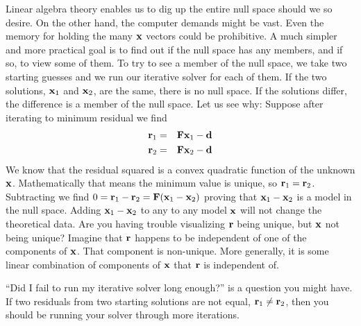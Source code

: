 \par
Linear algebra theory enables us to dig up the entire null space
should we so desire.
On the other hand, the computer demands might be vast.
Even the memory for holding the many $\bold x$ vectors could be prohibitive.
A much simpler and more practical goal
is to find out if the null space has any members,
and if so, to view some of them.
To try to see a member of the null space,
we take two starting guesses
and we run our iterative solver for each of them.
If the two solutions,
$\bold x_1$ and $\bold x_2$,
are the same, there is no null space.
If the solutions differ, the difference
is a member of the null space.
Let us see why:
Suppose after iterating to minimum residual we find
\begin{eqnarray}
\bold r_1 &=& \bold F\bold x_1 - \bold d
\\
\bold r_2 &=& \bold F\bold x_2 - \bold d 
\end{eqnarray}
We know that the residual squared is a convex quadratic function
of the unknown $\bold x$.
Mathematically that means the minimum value is unique,
so $\bold r_1 =\bold r_2$.
Subtracting
we find
$0=\bold r_1-\bold r_2 =\bold F(\bold x_1-\bold x_2)$
proving that $\bold x_1-\bold x_2$ is a model in the null space.
Adding $\bold x_1-\bold x_2$ to any to any model $\bold x$
will not change the theoretical data.
Are you having trouble visualizing $\bold r$ being unique,
but $\bold x$ not being unique?  Imagine that $\bold r$
happens to be independent of one of the components of $\bold x$.
That component is non-unique.
More generally, it is some linear combination of components of $\bold x$
that $\bold r$ is independent of.

\par
{}

\par
``Did I fail to run my iterative solver long enough?'' is
a question you might have.
If two residuals from two starting solutions are not equal,
$\bold r_1 \ne \bold r_2$,
then you should be running your solver through more iterations.

\par
{}

